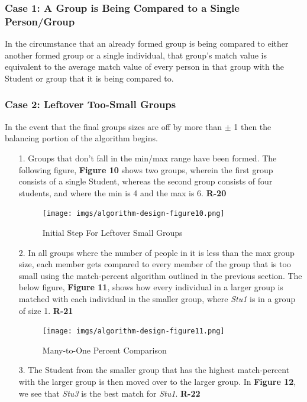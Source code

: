 \documentclass[12pt,letterpaper]{article}
\begin{document}
\subsubsection*{Case 1: A Group is Being Compared to a Single Person/Group}
In the circumstance that an already formed group is being compared to either another formed group or a single individual, that group's match value is equivalent to the average match value of every person in that group with the Student or group that it is being compared to. 
\subsubsection*{Case 2: Leftover Too-Small Groups}
In the event that the final groups sizes are off by more than $\pm$ 1 then the balancing portion of the algorithm begins.
\begin{enumerate}
	\item[1.] Groups that don't fall in the min/max range have been formed. The following figure, {\bf Figure 10} shows two groups, wherein the first group consists of a single Student, whereas the second group consists of four students, and where the min is 4 and the max is 6. {\bf R-20}
\begin{figure}[H]
	\caption{Initial Step For Leftover Small Groups}
	\begin{center}
		\texttt{[image: imgs/algorithm-design-figure10.png]}
	\end{center}
\end{figure}
	\item[2.] In all groups where the number of people in it is less than the max group size, each member gets compared to every member of the group that is too small using the match-percent algorithm outlined in the previous section. The below figure, {\bf Figure 11}, shows how every individual in a larger group is matched with each individual in the smaller group, where {\it Stu1} is in a group of size 1. {\bf R-21}
\begin{figure}[H]
	\caption{Many-to-One Percent Comparison}
	\begin{center}
		\texttt{[image: imgs/algorithm-design-figure11.png]}
	\end{center}
\end{figure}
	\item[3.] The Student from the smaller group that has the highest match-percent with the larger group is then moved over to the larger group. In {\bf Figure 12}, we see that {\it Stu3} is the best match for {\it Stu1}. {\bf R-22}

\end{enumerate}
\end{document}
